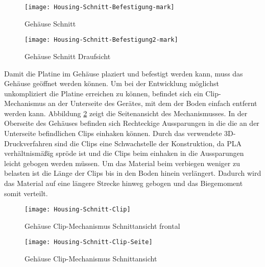 \begin{figure}[h]
	\begin{minipage}{.35\linewidth}
		\centering
		\texttt{[image: Housing-Schnitt-Befestigung-mark]}
		\caption{Gehäuse Schnitt}
		\label{fig:Housing-Befestigung}
	\end{minipage}
	\hfill
	\begin{minipage}{.55\linewidth}
		\centering
		\texttt{[image: Housing-Schnitt-Befestigung2-mark]}
		\caption{Gehäuse Schnitt Draufsicht}
		\label{fig:Housing-Befestigung2}
	\end{minipage}
\end{figure}
Damit die Platine im Gehäuse plaziert und befestigt werden kann, muss das Gehäuse geöffnet werden können. Um bei der Entwicklung möglichst unkompliziert die Platine erreichen zu können, befindet sich ein Clip-Mechanismus an der Unterseite des Gerätes, mit dem der Boden einfach entfernt werden kann. Abbildung \ref{fig:Housing-clip-side} zeigt die Seitenansicht des Mechanismusses. In der Oberseite des Gehäuses befinden sich Rechteckige Aussparungen in die die an der Unterseite befindlichen Clips einhaken können. Durch das verwendete 3D-Druckverfahren sind die Clips eine Schwachstelle der Konstruktion, da PLA verhältnismäßig spröde ist und die Clips beim einhaken in die Aussparungen leicht gebogen werden müssen. Um das Material beim verbiegen weniger zu belasten ist die Länge der Clips bis in den Boden hinein verlängert. Dadurch wird das Material auf eine längere Strecke hinweg gebogen und das Biegemoment somit verteilt.
\begin{figure}[h]
		\begin{minipage}{.45\linewidth}
		\centering
		\texttt{[image: Housing-Schnitt-Clip]}
		\caption{Gehäuse Clip-Mechanismus Schnittansicht frontal}
		\label{fig:Housing-clip}
	\end{minipage}
	\hfill
	\begin{minipage}{.45\linewidth}
		\centering
		\texttt{[image: Housing-Schnitt-Clip-Seite]}
		\caption{Gehäuse Clip-Mechanismus Schnittansicht}
		\label{fig:Housing-clip-side}
	\end{minipage}
\end{figure}\\

